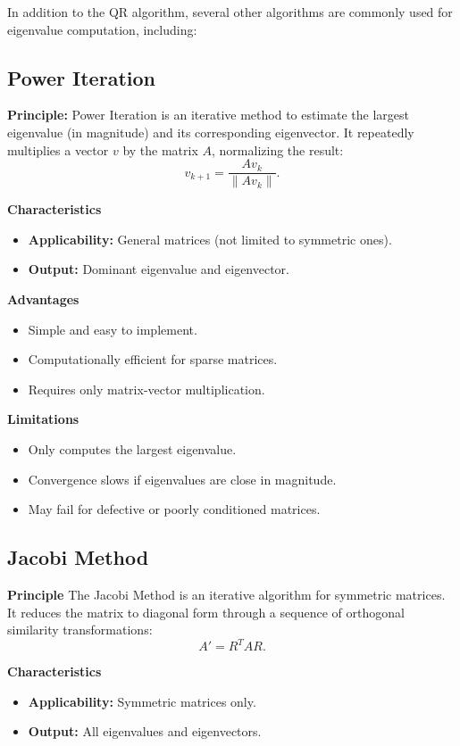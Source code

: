 \documentclass{article}
\begin{document}
In addition to the QR algorithm, several other algorithms are commonly used for eigenvalue computation, including:

\subsection{ Power Iteration}
\textbf{Principle:}
Power Iteration is an iterative method to estimate the largest eigenvalue (in magnitude) and its corresponding eigenvector. It repeatedly multiplies a vector \(v\) by the matrix \(A\), normalizing the result:
\[
v_{k+1} = \frac{Av_k}{\|Av_k\|}.
\]

\textbf{Characteristics}
\begin{itemize}
    \item \textbf{Applicability:} General matrices (not limited to symmetric ones).
    \item \textbf{Output:} Dominant eigenvalue and eigenvector.
\end{itemize}

\textbf{Advantages}
\begin{itemize}
    \item Simple and easy to implement.
    \item Computationally efficient for sparse matrices.
    \item Requires only matrix-vector multiplication.
\end{itemize}

\textbf{Limitations}
\begin{itemize}
    \item Only computes the largest eigenvalue.
    \item Convergence slows if eigenvalues are close in magnitude.
    \item May fail for defective or poorly conditioned matrices.
\end{itemize}

\subsection{ Jacobi Method}

\textbf{Principle}
The Jacobi Method is an iterative algorithm for symmetric matrices. It reduces the matrix to diagonal form through a sequence of orthogonal similarity transformations:
\[
A' = R^TAR.
\]

\textbf{Characteristics}
\begin{itemize}
    \item \textbf{Applicability:} Symmetric matrices only.
    \item \textbf{Output:} All eigenvalues and eigenvectors.
\end{itemize}
\end{document}
